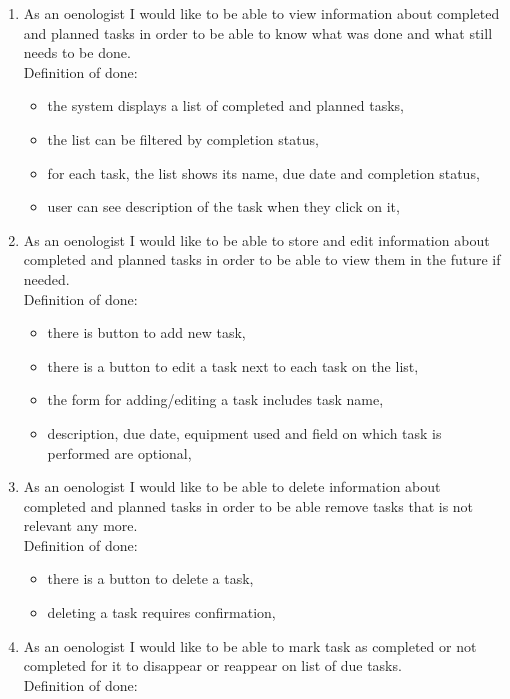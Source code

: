 \begin{enumerate}
	\item As an oenologist I would like to be able to view information about completed and planned tasks in order to be able to know what was done and what still needs to be done. \\Definition of done:
	\begin{itemize}
		\item the system displays a list of completed and planned tasks,
		\item the list can be filtered by completion status,
		\item for each task, the list shows its name, due date and completion status,
		\item user can see description of the task when they click on it,
	\end{itemize}
	\item As an oenologist I would like to be able to store and edit information about completed and planned tasks in order to be able to view them in the future if needed. \\Definition of done:
	\begin{itemize}
		\item there is button to add new task,
		\item there is a button to edit a task next to each task on the list,
		\item the form for adding/editing a task includes task name,
		\item description, due date, equipment used and field on which task is performed are optional,
	\end{itemize}
	\item As an oenologist I would like to be able to delete information about completed and planned tasks in order to be able remove tasks that is not relevant any more. \\Definition of done:
	\begin{itemize}
		\item there is a button to delete a task,
		\item deleting a task requires confirmation,
	\end{itemize}
	\item As an oenologist I would like to be able to mark task as completed or not completed for it to disappear or reappear on list of due tasks. \\Definition of done:

\end{enumerate}
